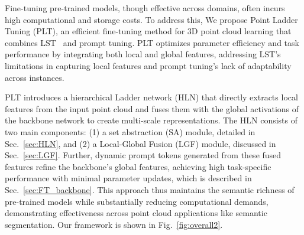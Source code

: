 Fine-tuning pre-trained models, though effective across domains, often incurs high computational and storage costs. To address this, We propose Point Ladder Tuning (PLT), an efficient fine-tuning method for 3D point cloud learning that combines LST~\cite{sung2022lst} and prompt tuning\cite{jia2022visual}. PLT optimizes parameter efficiency and task performance by integrating both local and global features, addressing LST’s limitations in capturing local features and prompt tuning’s lack of adaptability across instances.

PLT introduces a hierarchical Ladder network (HLN) that directly extracts local features from the input point cloud and fuses them with the global activations of the backbone network to create multi-scale representations. The HLN consists of two main components: (1) a set abstraction (SA) module, detailed in Sec.~\ref{sec:HLN}, and (2) a Local-Global Fusion (LGF) module, discussed in Sec.~\ref{sec:LGF}. Further, dynamic prompt tokens generated from these fused features refine the backbone’s global features, achieving high task-specific performance with minimal parameter updates, which is described in Sec.~\ref{sec:FT_backbone}. This approach thus maintains the semantic richness of pre-trained models while substantially reducing computational demands, demonstrating effectiveness across point cloud applications like semantic segmentation.
Our framework is shown in Fig.~\ref{fig:overall2}.




